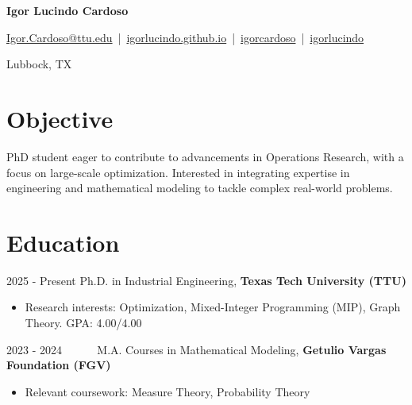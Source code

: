 \documentclass[a4paper,11pt]{article}
\newcommand{\socialicon}[1]{\raisebox{-0.05em}{\resizebox{!}{1em}{#1}}}
\newcommand{\headerfontiii}{\fontfamily{ppl}\selectfont} %
\begin{document}
\headerfontiii

\begin{center}
    {\Huge\textbf{Igor Lucindo Cardoso}}
\end{center}
\vspace{-6mm}

\begin{center}
    \small{
    \href{mailto:Igor.Cardoso@ttu.edu}{Igor.Cardoso@ttu.edu} \,|\, 
    \socialicon{\faGlobe} \href{https://igorlucindo.github.io}{igorlucindo.github.io} \,|\, 
    \socialicon{\faLinkedin} \href{https://www.linkedin.com/in/igorlucindo/}{igorcardoso} \,|\, 
    \socialicon{\faGithub} \href{https://github.com/igorlucindo}{igorlucindo}
    }
\end{center}
\vspace{-6mm}

\begin{center}
    \small{Lubbock, TX}
\end{center}

\vspace{-4mm}


\section{\textbf{Objective}}
\vspace{2mm}
\small{
PhD student eager to contribute to advancements in Operations Research, with a focus on large-scale optimization. Interested in integrating expertise in engineering and mathematical modeling to tackle complex real-world problems.
}

\section{\textbf{Education}}
\vspace{2mm}

2025 - Present \hspace{1.5mm} Ph.D. in Industrial Engineering, \textbf{Texas Tech University (TTU)}
\vspace{-1mm}
\begin{itemize}[leftmargin=80pt]
    \item Research interests: Optimization, Mixed-Integer Programming (MIP), Graph Theory. GPA: 4.00/4.00
\end{itemize}

2023 - 2024 \hspace{1.5mm}~~~~~ M.A. Courses in Mathematical Modeling, \textbf{Getulio Vargas Foundation (FGV)}
\vspace{-1mm}
\begin{itemize}[leftmargin=80pt]
    \item Relevant coursework: Measure Theory, Probability Theory
\end{itemize}
\end{document}
